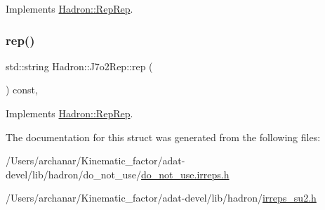 Implements \mbox{\hyperlink{structHadron_1_1RepRep_ab3213025f6de249f7095892109575fde}{Hadron\+::\+Rep\+Rep}}.

\mbox{\label{structHadron_1_1J7o2Rep_a7fe87890d8fa36768f1a09f929f26b9c}} 
\subsubsection{\texorpdfstring{rep()}{rep()}\hspace{0.1cm}{\footnotesize\ttfamily [5/5]}}
{\footnotesize\ttfamily std\+::string Hadron\+::\+J7o2\+Rep\+::rep (\begin{DoxyParamCaption}{ }\end{DoxyParamCaption}) const\hspace{0.3cm}{\ttfamily [inline]}, {\ttfamily [virtual]}}



Implements \mbox{\hyperlink{structHadron_1_1RepRep_ab3213025f6de249f7095892109575fde}{Hadron\+::\+Rep\+Rep}}.



The documentation for this struct was generated from the following files\+:\begin{DoxyCompactItemize}
\item 
/\+Users/archanar/\+Kinematic\+\_\+factor/adat-\/devel/lib/hadron/do\+\_\+not\+\_\+use/\mbox{\hyperlink{adat-devel_2lib_2hadron_2do__not__use_2do__not__use_8irreps_8h}{do\+\_\+not\+\_\+use.\+irreps.\+h}}\item 
/\+Users/archanar/\+Kinematic\+\_\+factor/adat-\/devel/lib/hadron/\mbox{\hyperlink{adat-devel_2lib_2hadron_2irreps__su2_8h}{irreps\+\_\+su2.\+h}}\end{DoxyCompactItemize}
